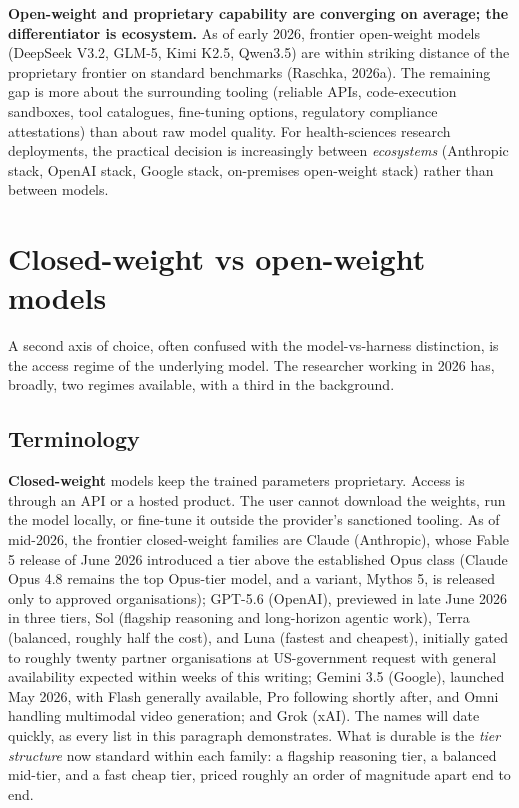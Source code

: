 \documentclass[
  letterpaper,
  11pt]{scrbook}
\begin{document}
\textbf{Open-weight and proprietary capability are converging on
average; the differentiator is ecosystem.} As of early 2026, frontier
open-weight models (DeepSeek V3.2, GLM-5, Kimi K2.5, Qwen3.5) are within
striking distance of the proprietary frontier on standard benchmarks
(Raschka, 2026a). The remaining gap is more about the surrounding
tooling (reliable APIs, code-execution sandboxes, tool catalogues,
fine-tuning options, regulatory compliance attestations) than about raw
model quality. For health-sciences research deployments, the practical
decision is increasingly between \emph{ecosystems} (Anthropic stack,
OpenAI stack, Google stack, on-premises open-weight stack) rather than
between models.

\section{Closed-weight vs open-weight
models}\label{closed-weight-vs-open-weight-models}

A second axis of choice, often confused with the model-vs-harness
distinction, is the access regime of the underlying model. The
researcher working in 2026 has, broadly, two regimes available, with a
third in the background.

\subsection{Terminology}\label{terminology}

\textbf{Closed-weight} models keep the trained parameters proprietary.
Access is through an API or a hosted product. The user cannot download
the weights, run the model locally, or fine-tune it outside the
provider's sanctioned tooling. As of mid-2026, the frontier
closed-weight families are Claude (Anthropic), whose Fable 5 release of
June 2026 introduced a tier above the established Opus class (Claude
Opus 4.8 remains the top Opus-tier model, and a variant, Mythos 5, is
released only to approved organisations); GPT-5.6 (OpenAI), previewed in
late June 2026 in three tiers, Sol (flagship reasoning and long-horizon
agentic work), Terra (balanced, roughly half the cost), and Luna
(fastest and cheapest), initially gated to roughly twenty partner
organisations at US-government request with general availability
expected within weeks of this writing; Gemini 3.5 (Google), launched May
2026, with Flash generally available, Pro following shortly after, and
Omni handling multimodal video generation; and Grok (xAI). The names
will date quickly, as every list in this paragraph demonstrates. What is
durable is the \emph{tier structure} now standard within each family: a
flagship reasoning tier, a balanced mid-tier, and a fast cheap tier,
priced roughly an order of magnitude apart end to end.
\end{document}
